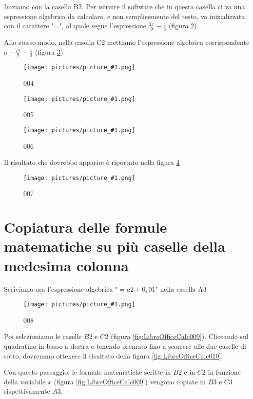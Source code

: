 \documentclass[17pt]{extarticle}
\newcommand{\pict}[1]{
\begin{figure}[h!]		
	\centering
   	\texttt{[image: pictures/picture\_\#1.png]}
  	\caption{#1}
   	\label{fig:LibreOfficeCalc#1}
\end{figure}
}
\begin{document}
 



Iniziamo con la casella B2. Per istruire il software che in questa casella ci va una espressione algebrica da calcolare, e non semplicemente del testo, va inizializzata con il carattere "=", al quale segue l'espressione $\frac{2x}{9} - \frac{4}{3}$ (figura \ref{fig:LibreOfficeCalc005}).


Allo stesso modo, nella casella C2 mettiamo l'espressione algebrica corrispondente a $-\frac{7x}{9} - \frac{1}{3}$ (figura \ref{fig:LibreOfficeCalc006})



\pict{004}



%
\pict{005}


%
\pict{006}


Il risultato che dovrebbe apparire è riportato nella figura \ref{fig:LibreOfficeCalc007}


%
\pict{007}


\section{Copiatura delle formule matematiche su più caselle della medesima colonna}

Scriviamo ora l'espressione algebrica "$=a2 + 0,01$" nella casella A3

%
\pict{008}


Poi selezioniamo le caselle $B2$ e $C2$ (figura \ref{fig:LibreOfficeCalc009}). Cliccando sul quadratino in basso a destra e tenendo premuto fino a scorrere alle due caselle di sotto, dovremmo ottenere il risultato della figura \ref{fig:LibreOfficeCalc010}.

Con questo passaggio, le formule matematiche scritte in $B2$ e in $C2$ in funzione della variabile $x$ (figura \ref{fig:LibreOfficeCalc009}) vengono copiate in $B3$ e $C3$ rispettivamente $A3$.
\end{document}
